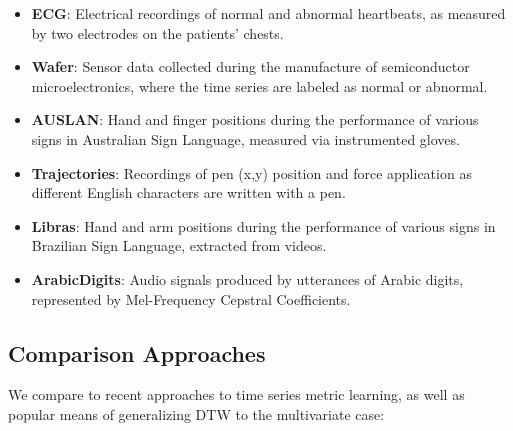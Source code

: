 \begin{itemize}
\item \textbf{ECG}: Electrical recordings of normal and abnormal heartbeats, as measured by two electrodes on the patients' chests.
\item \textbf{Wafer}: Sensor data collected during the manufacture of semiconductor microelectronics, where the time series are labeled as normal or abnormal.
\item \textbf{AUSLAN}: Hand and finger positions during the performance of various signs in Australian Sign Language, measured via instrumented gloves.
\item \textbf{Trajectories}: Recordings of pen (x,y) position and force application as different English characters are written with a pen. 
\item \textbf{Libras}: Hand and arm positions during the performance of various signs in Brazilian Sign Language, extracted from videos.
\item \textbf{ArabicDigits}: Audio signals produced by utterances of Arabic digits, represented by Mel-Frequency Cepstral Coefficients.
\end{itemize}



\subsection{Comparison Approaches}
We compare to recent approaches to time series metric learning, as well as popular means of generalizing DTW to the multivariate case: %

